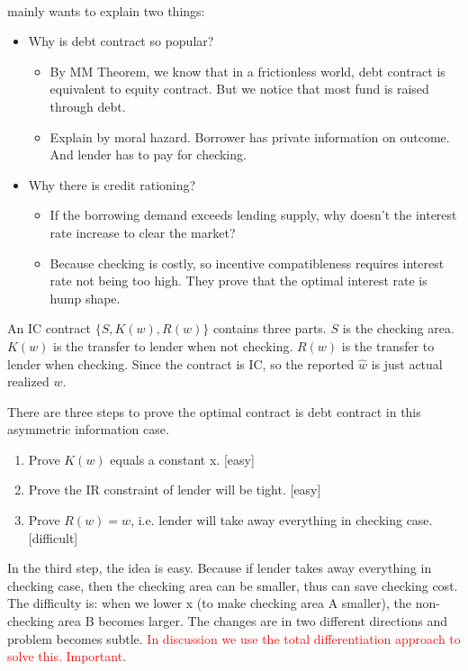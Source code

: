 \documentclass{book}
\theoremstyle{plain}
\theoremstyle{definition}
\begin{document}
\textbf{}\\

\cite{10.2307/1884684} mainly wants to explain two things:
\begin{itemize}
	\item Why is debt contract so popular?
	\begin{itemize}
		\item By MM Theorem, we know that in a frictionless world, debt contract is equivalent to equity contract. But we notice that most fund is raised through debt.
		\item Explain by moral hazard. Borrower has private information on outcome. And lender has to pay for checking.
	\end{itemize}
	\item Why there is credit rationing?
	\begin{itemize}
		\item If the borrowing demand exceeds lending supply, why doesn't the interest rate increase to clear the market?
		\item Because checking is costly, so incentive compatibleness requires interest rate not being too high.
		They prove that the optimal interest rate is hump shape.
	\end{itemize}
\end{itemize}

An IC contract $\{S,K(w),R(w)\}$ contains three parts. $S$ is the checking area. $K(w)$ is the transfer to lender when not checking. $R(w)$ is the transfer to lender when checking. Since the contract is IC, so the reported $\hat w$ is just actual realized $w$.

There are three steps to prove the optimal contract is debt contract in this asymmetric information case.
\begin{enumerate}
	\item Prove $K(w)$ equals a constant x. [easy]
	\item Prove the IR constraint of lender will be tight. [easy]
	\item Prove $R(w)=w$, i.e. lender will take away everything in checking case. [difficult] 
\end{enumerate}

In the third step, the idea is easy. Because if lender takes away everything in checking case, then the checking area can be smaller, thus can save checking cost. The difficulty is: when we lower x (to make checking area A smaller), the non-checking area B becomes larger. The changes are in two different directions and problem becomes subtle. \textcolor{red}{In discussion we use the total differentiation approach to solve this. Important}.\\
\end{document}
